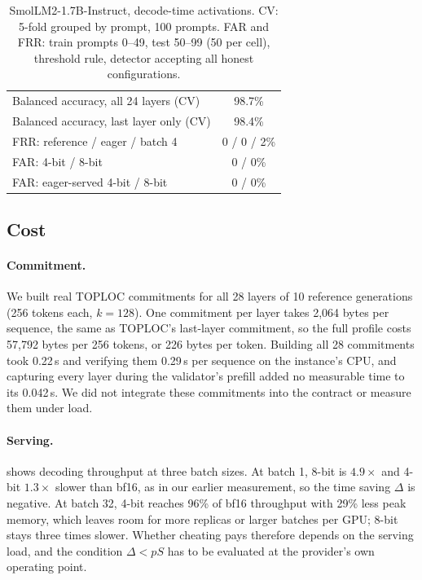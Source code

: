 \documentclass[11pt]{article}
\begin{document}
\begin{table}[!htb]
\centering
\small
\caption{SmolLM2-1.7B-Instruct, decode-time activations. CV: 5-fold grouped by prompt, 100 prompts. FAR and FRR: train prompts 0--49, test 50--99 (50 per cell), threshold rule, detector accepting all honest configurations.}
\label{tab:smol}
\begin{tabular}{@{}lc@{}}
\toprule
Balanced accuracy, all 24 layers (CV) & 98.7\% \\
Balanced accuracy, last layer only (CV) & 98.4\% \\
FRR: reference / eager / batch 4 & 0 / 0 / 2\% \\
FAR: 4-bit / 8-bit & 0 / 0\% \\
FAR: eager-served 4-bit / 8-bit & 0 / 0\% \\
\bottomrule
\end{tabular}
\end{table}


\subsection{Cost}
\label{sec:res-cost}

\paragraph{Commitment.}
We built real TOPLOC commitments for all 28 layers of 10 reference generations (256 tokens each, $k{=}128$).
One commitment per layer takes 2{,}064 bytes per sequence, the same as TOPLOC's last-layer commitment, so the full profile costs 57{,}792 bytes per 256 tokens, or 226 bytes per token.
Building all 28 commitments took 0.22\,s and verifying them 0.29\,s per sequence on the instance's CPU, and capturing every layer during the validator's prefill added no measurable time to its 0.042\,s.
We did not integrate these commitments into the contract or measure them under load.

\paragraph{Serving.}
 shows decoding throughput at three batch sizes.
At batch 1, 8-bit is $4.9\times$ and 4-bit $1.3\times$ slower than bf16, as in our earlier measurement, so the time saving $\Delta$ is negative.
At batch 32, 4-bit reaches 96\% of bf16 throughput with 29\% less peak memory, which leaves room for more replicas or larger batches per GPU; 8-bit stays three times slower.
Whether cheating pays therefore depends on the serving load, and the condition $\Delta < pS$ has to be evaluated at the provider's own operating point.
\end{document}
